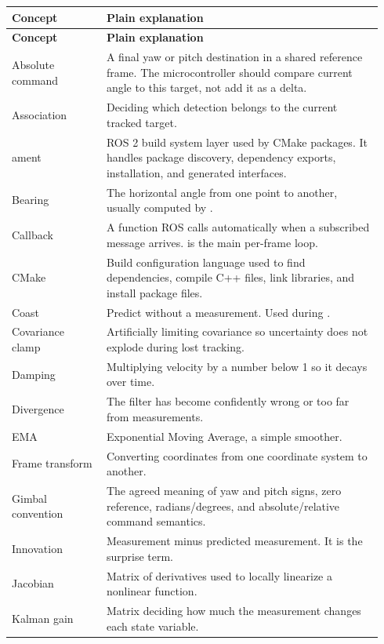 \documentclass[11pt,a4paper]{article}
\newcommand{\code}[1]{\ifmmode\text{\ttfamily\detokenize{#1}}\else\texttt{\detokenize{#1}}\fi}
\begin{document}
\begin{longtable}{p{0.24\linewidth} p{0.70\linewidth}}
\toprule
\textbf{Concept} & \textbf{Plain explanation} \\
\midrule
\endfirsthead
\toprule
\textbf{Concept} & \textbf{Plain explanation} \\
\midrule
\endhead
Absolute command & A final yaw or pitch destination in a shared reference frame. The microcontroller should compare current angle to this target, not add it as a delta. \\
Association & Deciding which detection belongs to the current tracked target. \\
ament & ROS 2 build system layer used by CMake packages. It handles package discovery, dependency exports, installation, and generated interfaces. \\
Bearing & The horizontal angle from one point to another, usually computed by \code{atan2(y,x)}. \\
Callback & A function ROS calls automatically when a subscribed message arrives. \code{detectionCallback()} is the main per-frame loop. \\
CMake & Build configuration language used to find dependencies, compile C++ files, link libraries, and install package files. \\
Coast & Predict without a measurement. Used during \code{TEMP_LOST}. \\
Covariance clamp & Artificially limiting covariance so uncertainty does not explode during lost tracking. \\
Damping & Multiplying velocity by a number below 1 so it decays over time. \\
Divergence & The filter has become confidently wrong or too far from measurements. \\
EMA & Exponential Moving Average, a simple smoother. \\
Frame transform & Converting coordinates from one coordinate system to another. \\
Gimbal convention & The agreed meaning of yaw and pitch signs, zero reference, radians/degrees, and absolute/relative command semantics. \\
Innovation & Measurement minus predicted measurement. It is the surprise term. \\
Jacobian & Matrix of derivatives used to locally linearize a nonlinear function. \\
Kalman gain & Matrix deciding how much the measurement changes each state variable. \\

\end{longtable}
\end{document}

